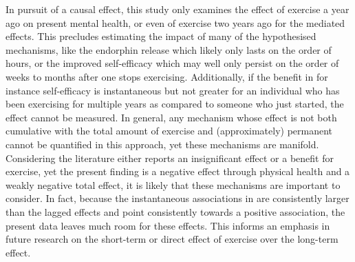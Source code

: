 In pursuit of a causal effect, this study only examines the effect of exercise a year ago on present mental health,
or even of exercise two years ago for the mediated effects.
This precludes estimating the impact of many of the hypothesised mechanisms, like the endorphin release which
likely only lasts on the order of hours, or the improved self-efficacy which may well only persist on the order of
weeks to months after one stops exercising.
Additionally, if the benefit in for instance self-efficacy is instantaneous but not greater for an individual
who has been exercising for multiple years as compared to someone who just started, the effect cannot be measured.
In general, any mechanism whose effect is not both cumulative with the total amount of exercise and (approximately)
permanent cannot be quantified in this approach, yet these mechanisms are manifold.
Considering the literature either reports an insignificant effect or a benefit for exercise, yet the present finding is
a negative effect through physical health and a weakly negative total effect, it is likely that these
mechanisms are important to consider.
In fact, because the instantaneous associations in  are consistently larger
than the lagged effects and point consistently towards a positive association,
the present data leaves much room for these effects.
This informs an emphasis in future research on the short-term or direct effect of exercise over the long-term effect.

